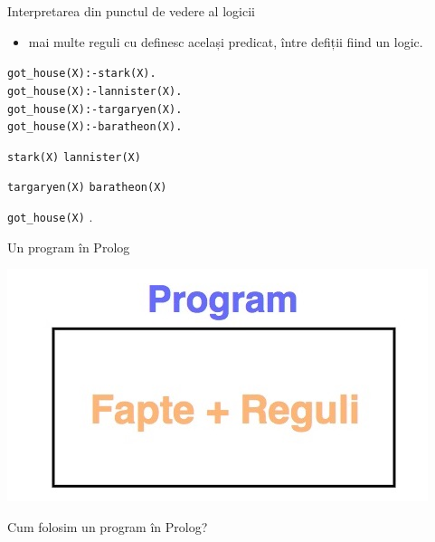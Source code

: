 \documentclass[xcolor=x11names,compress,10pt]{beamer}
\begin{document}
\begin{frame}{Interpretarea din punctul de vedere al logicii}
\begin{itemize}
\item  mai multe reguli cu  definesc același predicat, între defiții fiind un  logic. 
\end{itemize}

\begin{example}
\begin{alltt}
got\_house(X) :- stark(X).\\
got\_house(X) :- lannister(X).\\
got\_house(X) :- targaryen(X).\\
got\_house(X) :- baratheon(X).
\end{alltt}
\smallskip


 \texttt{stark(X)} 
\texttt{lannister(X)} 
 
  \texttt{targaryen(X)} 
 \texttt{baratheon(X)}  
  

\texttt{got\_house(X)} .



\end{example}
\end{frame}


\begin{frame}{Un program în Prolog}

\begin{center}

\includegraphics[scale=.3]{img/Prolog1}

\vspace*{1cm}

Cum folosim un program în Prolog?
\end{center}


\end{frame}
\end{document}
